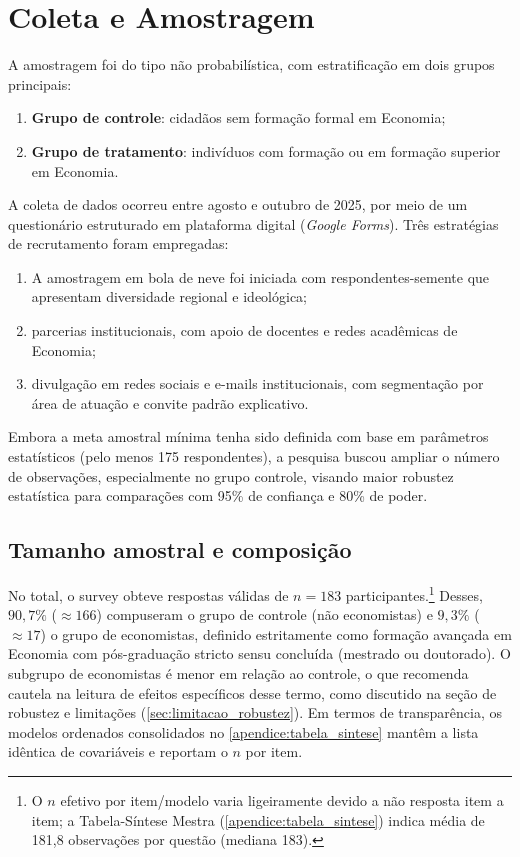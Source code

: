 \section{Coleta e Amostragem}\label{sec:coleta-amostragem}

A amostragem foi do tipo não probabilística, com estratificação em dois grupos principais:
\begin{enumerate}[label=\alph*)]
    \item \textbf{Grupo de controle}: cidadãos sem formação formal em Economia;
    \item \textbf{Grupo de tratamento}: indivíduos com formação ou em formação superior em Economia.
\end{enumerate}

A coleta de dados ocorreu entre agosto e outubro de 2025, por meio de um questionário estruturado em plataforma digital (\textit{Google Forms}). Três estratégias de recrutamento foram empregadas:
\begin{enumerate}[label=\alph*)]
    \item A amostragem em bola de neve foi iniciada com respondentes-semente que apresentam diversidade regional e ideológica;
    \item parcerias institucionais, com apoio de docentes e redes acadêmicas de Economia;
    \item divulgação em redes sociais e e-mails institucionais, com segmentação por área de atuação e convite padrão explicativo.
\end{enumerate}

Embora a meta amostral mínima tenha sido definida com base em parâmetros estatísticos (pelo menos 175 respondentes), a pesquisa buscou ampliar o número de observações, especialmente no grupo controle, visando maior robustez estatística para comparações com 95\% de confiança e 80\% de poder.

\subsection{Tamanho amostral e composição}
No total, o survey obteve respostas válidas de \(n = 183\) participantes.\footnote{O \(n\) efetivo por item/modelo varia ligeiramente devido a não resposta item a item; a Tabela-Síntese Mestra (\autoref{apendice:tabela_sintese}) indica média de 181{,}8 observações por questão (mediana 183).}
Desses, \(90{,}7\%\) (\(\approx 166\)) compuseram o grupo de controle (não economistas) e \(9{,}3\%\) (\(\approx 17\)) o grupo de economistas, definido estritamente como formação avançada em Economia com pós-graduação stricto sensu concluída (mestrado ou doutorado).
O subgrupo de economistas é menor em relação ao controle, o que recomenda cautela na leitura de efeitos específicos desse termo, como discutido na seção de robustez e limitações (\autoref{sec:limitacao_robustez}). Em termos de transparência, os modelos ordenados consolidados no \autoref{apendice:tabela_sintese} mantêm a lista idêntica de covariáveis e reportam o \(n\) por item.

